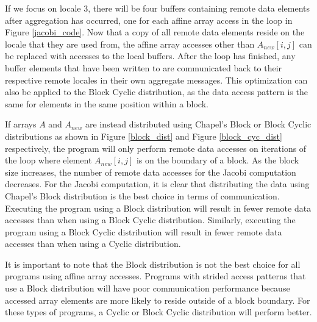 If we focus on locale 3, there will be four buffers containing remote data elements after aggregation has occurred, one for each affine array access in the loop in Figure \ref{jacobi_code}. Now that a copy of all remote data elements reside on the locale that they are used from, the affine array accesses other than $A_{new}[i, j]$ can be replaced with accesses to the local buffers. After the loop has finished, any buffer elements that have been written to are communicated back to their respective remote locales in their own aggregate messages. This optimization can also be applied to the Block Cyclic distribution, as the data access pattern is the same for elements in the same position within a block. 

If arrays $A$ and $A_{new}$ are instead distributed using Chapel's Block or Block Cyclic distributions as shown in Figure \ref{block_dist} and Figure \ref{block_cyc_dist} respectively, the program will only perform remote data accesses on iterations of the loop where element $A_{new}[i, j]$ is on the boundary of a block. As the block size increases, the number of remote data accesses for the Jacobi computation decreases. For the Jacobi computation, it is clear that distributing the data using Chapel's Block distribution is the best choice in terms of communication. Executing the program using a Block distribution will result in fewer remote data accesses than when using a Block Cyclic distribution. Similarly, executing the program using a Block Cyclic distribution will result in fewer remote data accesses than when using a Cyclic distribution. 

It is important to note that the Block distribution is not the best choice for all programs using affine array accesses. Programs with strided access patterns that use a Block distribution will have poor communication performance because accessed array elements are more likely to reside outside of a block boundary. For these types of programs, a Cyclic or Block Cyclic distribution will perform better. 

